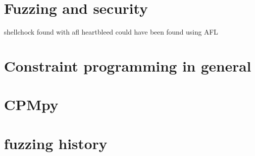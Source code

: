 
\section{Fuzzing and security}
shellchock found with afl
heartbleed could have been found using AFL 



\section{Constraint programming in general}

\section{CPMpy}

\section{fuzzing history}


